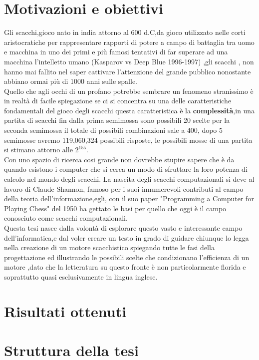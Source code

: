 \section{Motivazioni e obiettivi}
Gli scacchi,gioco nato in india attorno al 600 d.C,da gioco utilizzato nelle corti aristocratiche
 per rappresentare rapporti di potere a campo di battaglia tra uomo e macchina in uno dei primi e 
 più famosi tentativi di far superare ad una macchina l'intelletto umano (Kasparov vs Deep Blue 1996-1997)
,gli scacchi , non hanno mai  fallito nel saper cattivare  l'attenzione
 del grande pubblico nonostante abbiano ormai più di 1000 anni sulle spalle.
 \\Quello che agli occhi di un profano potrebbe sembrare un fenomeno  stranissimo
 è in realtà di facile spiegazione se ci si concentra su una delle caratteristiche fondamentali del 
 gioco degli scacchi  questa caratteristica è la \textbf{complessità},in una partita di scacchi fin dalla prima semimossa 
  sono possibili 20 scelte per la seconda semimossa il totale di possibili combinazioni  sale a 400,
 dopo 5 semimosse avremo 119,060,324 possibili risposte, le possibili mosse di una partita si stimano attorno alle \(2^{155} \).
 \\Con uno spazio di ricerca cosi grande non dovrebbe stupire sapere che è da quando esistono i computer che si cerca un modo
 di sfruttare la loro potenza di calcolo nel mondo degli scacchi.
 La nascita degli scacchi computazionali si deve al lavoro di Claude Shannon, famoso per i suoi innumerevoli contributi al 
 campo della teoria dell'informazione,egli, con il suo paper "Programming a Computer for Playing Chess" del 1950 ha gettato le
 basi per quello che oggi è il campo conosciuto come scacchi computazionali.
 \\Questa tesi nasce dalla volontà di esplorare questo vasto e interessante campo dell'informatica,e dal voler creare un testo
 in grado di guidare chiunque lo legga nella creazione di un motore scacchistico spiegando tutte le fasi della progettazione
 ed illustrando le possibili scelte che condizionano l'efficienza di un motore
 ,dato che la letteratura su questo fronte è  non particolarmente florida e soprattutto quasi esclusivamente in lingua inglese.




\section{Risultati ottenuti}

\section{Struttura della tesi}


